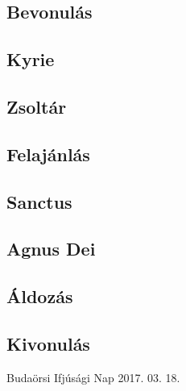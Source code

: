 \documentclass[a5paper,twoside]{article}
\begin{document}
  \begin{songs}{}
    \begin{intersong*}\section*{Bevonulás}\end{intersong*}
    

    \begin{intersong*}\section*{Kyrie}\end{intersong*}
    

    \begin{intersong*}\section*{Zsoltár}\end{intersong*}
    

    \begin{intersong*}\section*{Felajánlás}\end{intersong*}
    

    \begin{intersong*}\section*{Sanctus}\end{intersong*}
    

    \begin{intersong*}\section*{Agnus Dei}\end{intersong*}
    

    \begin{intersong*}\section*{Áldozás}\end{intersong*}
    
    
    

    \begin{intersong*}\section*{Kivonulás}\end{intersong*}
    
  \end{songs}

  \newpage\null
  \vfill\hfill
  Budaörsi Ifjúsági Nap
  \newline\null\hfill
  2017. 03. 18.
\end{document}
